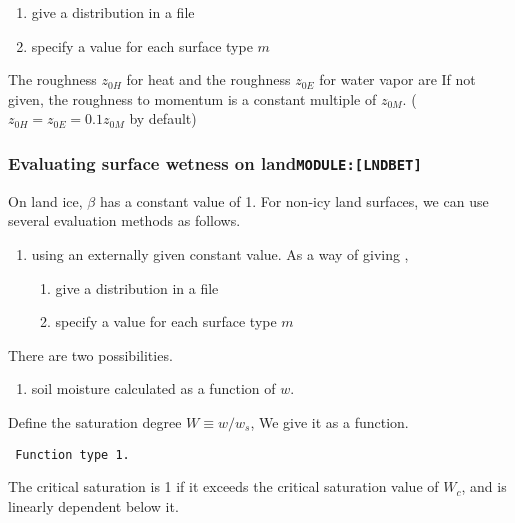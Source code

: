 \begin{enumerate}
\def\labelenumi{\arabic{enumi}.}
\item
  give a distribution in a file
\item
  specify a value for each surface type \(m\)
\end{enumerate}

The roughness \(z_{0H}\) for heat and the roughness \(z_{0E}\) for water
vapor are If not given, the roughness to momentum is a constant multiple
of \(z_{0M}\). (\(z_{0H} = z_{0E} = 0.1 z_{0M}\) by default)

\hypertarget{evaluating-surface-wetness-on-landmodulelndbet}{%
\subsubsection{\texorpdfstring{Evaluating surface wetness on
land\texttt{MODULE:{[}LNDBET{]}}}{Evaluating surface wetness on landMODULE:{[}LNDBET{]}}}\label{evaluating-surface-wetness-on-landmodulelndbet}}

On land ice, \(\beta\) has a constant value of 1. For non-icy land
surfaces, we can use several evaluation methods as follows.

\begin{enumerate}
\def\labelenumi{\arabic{enumi}.}
\item
  using an externally given constant value. As a way of giving ,

  \begin{enumerate}
  \def\labelenumii{\arabic{enumii}.}
  \item
    give a distribution in a file
  \item
    specify a value for each surface type \(m\)
  \end{enumerate}
\end{enumerate}

There are two possibilities.

\begin{enumerate}
\def\labelenumi{\arabic{enumi}.}
\setcounter{enumi}{1}
\tightlist
\item
  soil moisture calculated as a function of \(w\).
\end{enumerate}

Define the saturation degree \(W \equiv w/w_s\), We give it as a
function.

\begin{verbatim}
 Function type 1.
\end{verbatim}

The critical saturation is 1 if it exceeds the critical saturation value
of \(W_c\), and is linearly dependent below it.

